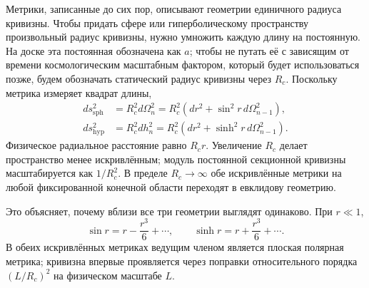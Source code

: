 Метрики, записанные до сих пор, описывают геометрии единичного радиуса кривизны. Чтобы придать сфере или гиперболическому пространству произвольный радиус кривизны, нужно умножить каждую длину на постоянную. На доске эта постоянная обозначена как \(a\); чтобы не путать её с зависящим от времени космологическим масштабным фактором, который будет использоваться позже, будем обозначать статический радиус кривизны через \(R_c\). Поскольку метрика измеряет квадрат длины,
\begin{align}
ds_{\mathrm{sph}}^2
  &=R_c^2d\Omega_n^2
   =R_c^2\left(dr^2+\sin^2r\,d\Omega_{n-1}^2\right),\\
ds_{\mathrm{hyp}}^2
  &=R_c^2dh_n^2
   =R_c^2\left(dr^2+\sinh^2r\,d\Omega_{n-1}^2\right).
\label{eq:c03-scaled-curvature}
\end{align}
Физическое радиальное расстояние равно \(R_cr\). Увеличение \(R_c\) делает пространство менее искривлённым; модуль постоянной секционной кривизны масштабируется как \(1/R_c^2\). В пределе \(R_c\to\infty\) обе искривлённые метрики на любой фиксированной конечной области переходят в евклидову геометрию.

\begin{classroomqa}
\end{classroomqa}

Это объясняет, почему вблизи все три геометрии выглядят одинаково. При \(r\ll1\),
\begin{equation}
\sin r=r-\frac{r^3}{6}+\cdots,
\qquad
\sinh r=r+\frac{r^3}{6}+\cdots.
\end{equation}
В обеих искривлённых метриках ведущим членом является плоская полярная метрика; кривизна впервые проявляется через поправки относительного порядка \((L/R_c)^2\) на физическом масштабе \(L\).

\begin{classroomqa}
\end{classroomqa}

